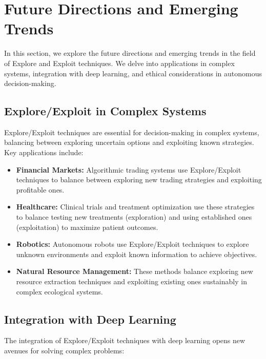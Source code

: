\documentclass[12pt]{book} %
\begin{document}
\section{Future Directions and Emerging Trends}

In this section, we explore the future directions and emerging trends in the field of Explore and Exploit techniques. We delve into applications in complex systems, integration with deep learning, and ethical considerations in autonomous decision-making.

\subsection{Explore/Exploit in Complex Systems}

Explore/Exploit techniques are essential for decision-making in complex systems, balancing between exploring uncertain options and exploiting known strategies. Key applications include:

\begin{itemize}
    \item \textbf{Financial Markets:} Algorithmic trading systems use Explore/Exploit techniques to balance between exploring new trading strategies and exploiting profitable ones.
    \item \textbf{Healthcare:} Clinical trials and treatment optimization use these strategies to balance testing new treatments (exploration) and using established ones (exploitation) to maximize patient outcomes.
    \item \textbf{Robotics:} Autonomous robots use Explore/Exploit techniques to explore unknown environments and exploit known information to achieve objectives.
    \item \textbf{Natural Resource Management:} These methods balance exploring new resource extraction techniques and exploiting existing ones sustainably in complex ecological systems.
\end{itemize}

\subsection{Integration with Deep Learning}

The integration of Explore/Exploit techniques with deep learning opens new avenues for solving complex problems:
\end{document}
